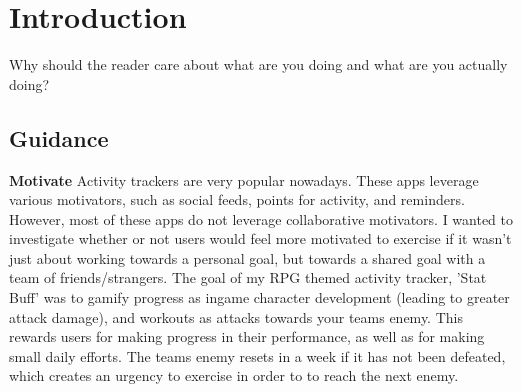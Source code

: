 \documentclass{l4proj}
\begin{document}
%
%
%
%
%
%
%
%
\chapter{Introduction}




Why should the reader care about what are you doing and what are you actually doing?
\section{Guidance}

\textbf{Motivate} 
Activity trackers are very popular nowadays. These apps leverage various motivators, such as social feeds, points for activity, and reminders. However, most of these apps do not leverage collaborative motivators. I wanted to investigate whether or not users would feel more motivated to exercise if it wasn't just about working towards a personal goal, but towards a shared goal with a team of friends/strangers. The goal of my RPG themed activity tracker, 'Stat Buff' was to gamify progress as ingame character development (leading to greater attack damage), and workouts as attacks towards your teams enemy. This rewards users for making progress in their performance, as well as for making small daily efforts. The teams enemy resets in a week if it has not been defeated, which creates an urgency to exercise in order to to reach the next enemy.
\end{document}

